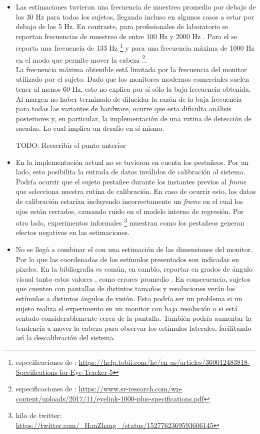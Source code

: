 \begin{itemize}
  \item Las estimaciones tuvieron una frecuencia de muestreo promedio por
debajo de los 30 Hz para todos los sujetos, llegando incluso en algunos casos a
estar por debajo de los 5 Hz.
  En contraste, para \eyetrackers profesionales de laboratorio se reportan
frecuencias de muestreo de entre 100 Hz y 2000 Hz \cite{hosp_2020_remote_eye}.
  Para el \tobii se reporta una frecuencia de 133 Hz \footnote{especificaciones
de \tobii:
\url{https://help.tobii.com/hc/en-us/articles/360012483818-Specifications-for-Eye-Tracker-5}}
y para \eyelink una frecuencia máxima de 1000 Hz en el modo que permite mover
la cabeza \footnote{especificaciones de \eyelink:
\url{https://www.sr-research.com/wp-content/uploads/2017/11/eyelink-1000-plus-specifications.pdf}}.
\\
  La frecuencia máxima obtenible está limitada por la frecuencia del monitor
utilizado por el sujeto.
  Dado que los monitores modernos comerciales suelen tener al menos 60 Hz, esto
no explica por sí sólo la baja frecuencia obtenida. \\
  Al margen no haber terminado de dilucidar la razón de la baja frecuencia para
todas las variantes de hardware, ocurre que esta dificulta análisis posteriores
y, en particular, la implementación de una rutina de detección de sacadas.
  Lo cual implica un desafío en sí mismo.

  TODO: Reescribir el punto anterior

  \item En la implementación actual no se tuvieron en cuenta los pestañeos.
  Por un lado, esto posibilita la entrada de datos inválidos de calibración al
sistema.
  Podría ocurrir que el sujeto pestañee durante los instantes previos al
\textit{frame} que selecciona nuestra rutina de calibración.
  En caso de ocurrir esto, los datos de calibración estarían incluyendo
incorrectamente un \textit{frame} en el cual los ojos están cerrados, causando
ruido en el modelo interno de regresión.
  Por otro lado, experimentos informales \footnote{hilo de twitter:
\url{https://twitter.com/_HanZhang_/status/1527762369593606145}} muestran como
los pestañeos generan efectos negativos en las estimaciones.

  \item
    No se llegó a combinar el \eyetracking con una estimación de las
    dimensiones del monitor.
    Por lo que las coordenadas de los estímulos presentados son indicadas en
    píxeles.
    En la bibliografía es común, en cambio, reportar en grados de ángulo visual
    tanto estos valores \cite{munoz_2004_look_away,
    olincy_1997_age_diminishes_performance, smyrnis_2002_big_sample}, como
    errores promedio \cite{huang_2016_pace, santini_2017_eyerectoo}.
    En consecuencia, sujetos que cuenten con pantallas de distintos tamaños y
    resoluciones verán los estímulos a distintos ángulos de visión.
    Esto podría ser un problema si un sujeto realiza el experimento en un
    monitor con baja resolución o si está sentado considerablemente cerca de la
    pantalla.
    También podría aumentar la tendencia a mover la cabeza para observar los
    estímulos laterales, facilitando así la descalibración del sistema.


\end{itemize}
